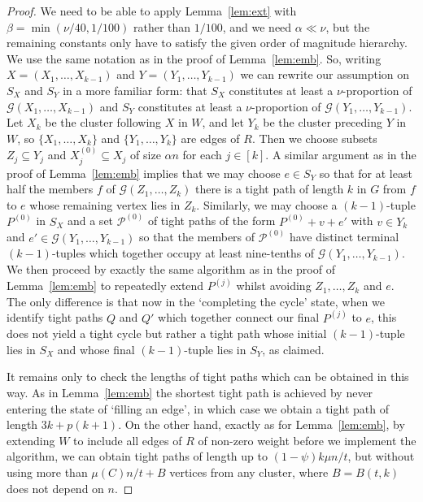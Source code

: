 \documentclass[12pt,a4paper]{amsart}
\newcommand{\cG}{\mathcal{G}}
\newcommand{\paths}{\mathscr{P}}
\begin{document}
\begin{proof}
We need to be able to apply Lemma~\ref{lem:ext} with
$\beta=\min(\nu/40,1/100)$ rather than $1/100$, and we need $\alpha\ll\nu$, but
the remaining constants only have to satisfy the given order of magnitude hierarchy.
We use the same notation as in the proof of Lemma~\ref{lem:emb}. So, writing $X
= (X_1, \dots, X_{k-1})$ and $Y = (Y_1, \dots, Y_{k-1})$ we can rewrite our
assumption on $S_X$ and $S_Y$ in a more familiar form: that $S_X$ constitutes at
least a $\nu$-proportion of $\cG(X_1, \dots, X_{k-1})$ and $S_Y$ constitutes at
least a $\nu$-proportion of $\cG(Y_1, \dots, Y_{k-1})$. Let $X_k$ be the cluster
following $X$ in $W$, and let $Y_k$ be the cluster preceding $Y$ in $W$, so
$\{X_1, \dots, X_k\}$ and $\{Y_1, \dots, Y_k\}$ are edges of $R$. Then we choose
subsets $Z_j \subseteq Y_j$ and $X^{(0)}_j \subseteq X_j$ of size $\alpha n$ for
each $j \in [k]$. A similar argument as in the proof of Lemma~\ref{lem:emb}
implies that we may choose $e \in S_Y$ so that for at least half the members $f$
of $\cG(Z_1, \dots, Z_k)$ there is a tight path of length $k$ in $G$ from $f$ to
$e$ whose remaining vertex lies in $Z_k$. Similarly, we may choose a
$(k-1)$-tuple $P^{(0)}$ in $S_X$ and a set $\paths^{(0)}$ of tight paths of the
form $P^{(0)} + v + e'$ with $v \in Y_k$ and $e' \in \cG(Y_1, \dots, Y_{k-1})$
so that the members of $\paths^{(0)}$ have distinct terminal $(k-1)$-tuples
which together occupy at least nine-tenths of $\cG(Y_1, \dots, Y_{k-1})$. We
then proceed by exactly the same algorithm as in the proof of
Lemma~\ref{lem:emb} to repeatedly extend $P^{(j)}$ whilst avoiding $Z_1, \dots,
Z_{k}$ and $e$. The only difference is that now in the `completing the cycle'
state, when we identify tight paths $Q$ and $Q'$ which together connect our
final $P^{(j)}$ to $e$, this does not yield a tight cycle but rather a tight
path whose initial $(k-1)$-tuple lies in $S_X$ and whose final $(k-1)$-tuple
lies in $S_Y$, as claimed.

It remains only to check the lengths of tight paths which can be obtained in
this way. As in Lemma~\ref{lem:emb} the shortest tight path is achieved by never
entering the state of `filling an edge', in which case we obtain a tight path of
length $3k + p(k+1)$. On the other hand, exactly as for Lemma~\ref{lem:emb}, by
extending $W$ to include all edges of $R$ of non-zero weight before we implement
the algorithm, we can obtain tight paths of length up to $(1-\psi)k\mu
n/t$, but without using more than $\mu(C)n/t + B$ vertices from any
cluster, where $B=B(t,k)$ does not depend on $n$.
\end{proof}
\end{document}

